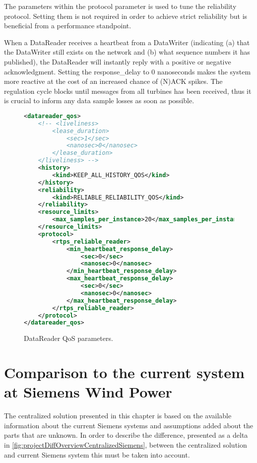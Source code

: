 \begin{itemize}
	The parameters within the protocol parameter is used to tune the reliability protocol. Setting them is not required in order to achieve strict reliability but is beneficial from a performance standpoint. 
	
	When a DataReader receives a heartbeat from a DataWriter (indicating (a) that the DataWriter still exists on the network and (b) what sequence numbers it has published), the DataReader will instantly reply with a positive or negative acknowledgment. Setting the response\_delay to 0 nanoseconds makes the system more reactive at the cost of an increased chance of (N)ACK spikes. The regulation cycle blocks until messages from all turbines has been received, thus it is crucial to inform any data sample losses as soon as possible.
\end{itemize}


\begin{figure}[!h]
\begin{lstlisting}[language=XML]
<datareader_qos>
	<!-- <liveliness>
		<lease_duration>
			<sec>1</sec>
			<nanosec>0</nanosec>
		</lease_duration>
	</liveliness> -->
	<history>
		<kind>KEEP_ALL_HISTORY_QOS</kind>
	</history>
	<reliability>
		<kind>RELIABLE_RELIABILITY_QOS</kind>
	</reliability>
	<resource_limits>
		<max_samples_per_instance>20</max_samples_per_instance>
	</resource_limits>
	<protocol>
		<rtps_reliable_reader>
			<min_heartbeat_response_delay>
				<sec>0</sec>
				<nanosec>0</nanosec>
			</min_heartbeat_response_delay>
			<max_heartbeat_response_delay>
				<sec>0</sec>
				<nanosec>0</nanosec>
			</max_heartbeat_response_delay>
		</rtps_reliable_reader>
	</protocol>
</datareader_qos>
\end{lstlisting}
\caption[DataReader QoS parameters]{
		\label{fig:readerQoS} 
		\footnotesize{DataReader QoS parameters.}
	}
\end{figure}

\FloatBarrier

\section{Comparison to the current system at Siemens Wind Power} \label{sec:CenAndCurrentSiemensSystemComparison}
The centralized solution presented in this chapter is based on the available information about the current Siemens systems and assumptions added about the parts that are unknown. In order to describe the difference, presented as a delta in \cref{fig:projectDiffOverviewCentralizedSiemens}, between the centralized solution and current Siemens system this must be taken into account.

